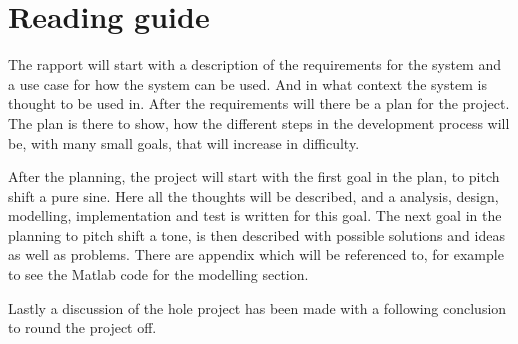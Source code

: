 
\chapter*{Reading guide}
The rapport will start with a description of the requirements for the system and a use case for how the system can be used.
And in what context the system is thought to be used in.
After the requirements will there be a plan for the project.
The plan is there to show, how the different steps in the development process will be, with many small goals, that will increase in difficulty.

After the planning, the project will start with the first goal in the plan, to pitch shift a pure sine. 
Here all the thoughts will be described, and a analysis, design, modelling, implementation and test is written for this goal. 
The next goal in the planning to pitch shift a tone, is then described with possible solutions and ideas as well as problems.
There are appendix which will be referenced to, for example to see the Matlab code for the modelling section. 

Lastly a discussion of the hole project has been made with a following conclusion to round the project off. 
